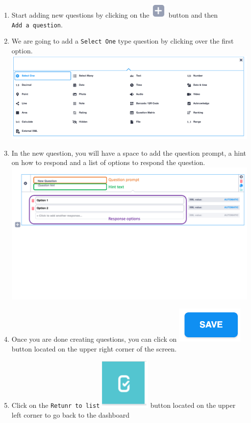 \documentclass[
  letterpaper,
  DIV=11,
  numbers=noendperiod]{scrartcl}
\begin{document}
\begin{enumerate}
\def\labelenumi{\arabic{enumi}.}
\setcounter{enumi}{4}
\item
  Start adding new questions by clicking on the
  \includegraphics{kobotoolbox_tutorial_files/img/img6_1.png} button and
  then \texttt{Add\ a\ question}.
\item
  We are going to add a \texttt{Select\ One} type question by clicking
  over the first option.
  \includegraphics{kobotoolbox_tutorial_files/img/img7.png}
\item
  In the new question, you will have a space to add the question prompt,
  a hint on how to respond and a list of options to respond the
  question. \includegraphics{kobotoolbox_tutorial_files/img/img8.png}
\item
  Once you are done creating questions, you can click on
  \includegraphics{kobotoolbox_tutorial_files/img/img9.png} button
  located on the upper right corner of the screen.
\item
  Click on the \texttt{Retunr\ to\ list}
  \includegraphics{kobotoolbox_tutorial_files/img/img10.png} button
  located on the upper left corner to go back to the dashboard
\end{enumerate}
\end{document}

